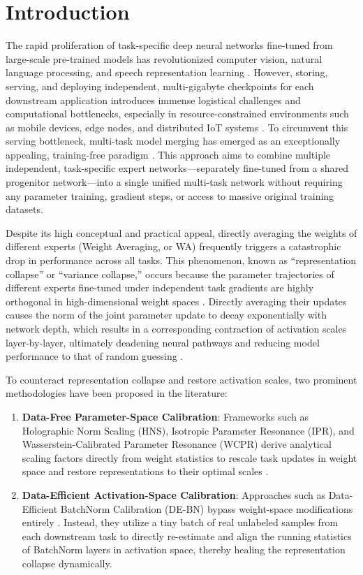 \documentclass{article}
\theoremstyle{plain}
\theoremstyle{definition}
\theoremstyle{remark}
\begin{document}
\section{Introduction}
\label{sec:intro}
The rapid proliferation of task-specific deep neural networks fine-tuned from large-scale pre-trained models has revolutionized computer vision, natural language processing, and speech representation learning \cite{he2016deep, wortsman2022model, ilharco2022editing}. However, storing, serving, and deploying independent, multi-gigabyte checkpoints for each downstream application introduces immense logistical challenges and computational bottlenecks, especially in resource-constrained environments such as mobile devices, edge nodes, and distributed IoT systems \cite{gholami2021survey, han2015deep}. To circumvent this serving bottleneck, multi-task model merging has emerged as an exceptionally appealing, training-free paradigm \cite{yadav2023ties, yu2024dare}. This approach aims to combine multiple independent, task-specific expert networks—separately fine-tuned from a shared progenitor network—into a single unified multi-task network without requiring any parameter training, gradient steps, or access to massive original training datasets.

Despite its high conceptual and practical appeal, directly averaging the weights of different experts (Weight Averaging, or WA) frequently triggers a catastrophic drop in performance across all tasks. This phenomenon, known as ``representation collapse'' or ``variance collapse,'' occurs because the parameter trajectories of different experts fine-tuned under independent task gradients are highly orthogonal in high-dimensional weight spaces \cite{jordan2023repair, ainsworth2022git}. Directly averaging their updates causes the norm of the joint parameter update to decay exponentially with network depth, which results in a corresponding contraction of activation scales layer-by-layer, ultimately deadening neural pathways and reducing model performance to that of random guessing \cite{anonymous2026a}.

To counteract representation collapse and restore activation scales, two prominent methodologies have been proposed in the literature:
\begin{enumerate}
    \item \textbf{Data-Free Parameter-Space Calibration}: Frameworks such as Holographic Norm Scaling (HNS), Isotropic Parameter Resonance (IPR), and Wasserstein-Calibrated Parameter Resonance (WCPR) derive analytical scaling factors directly from weight statistics to rescale task updates in weight space and restore representations to their optimal scales \cite{visionary2026holographic, anonymous2026b, anonymous2026c}.
    \item \textbf{Data-Efficient Activation-Space Calibration}: Approaches such as Data-Efficient BatchNorm Calibration (DE-BN) bypass weight-space modifications entirely \cite{jordan2023calibrating, kim2024task}. Instead, they utilize a tiny batch of real unlabeled samples from each downstream task to directly re-estimate and align the running statistics of BatchNorm layers in activation space, thereby healing the representation collapse dynamically.
\end{enumerate}
\end{document}
